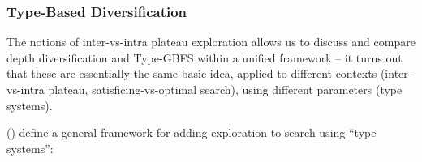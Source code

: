 % 

\subsubsection{Type-Based Diversification}

The notions of inter-vs-intra plateau exploration allows us to discuss and compare depth diversification \cite{Asai2016} and Type-GBFS \cite{xie14type} within a unified framework
 -- it turns out that
these are essentially the same basic idea,  applied to different contexts (inter-vs-intra plateau, satisficing-vs-optimal search), using different parameters (type systems).

\citeauthor{lelis2013stratified} (\citeyear{lelis2013stratified}) define a general framework for adding exploration to search using ``type systems'':


